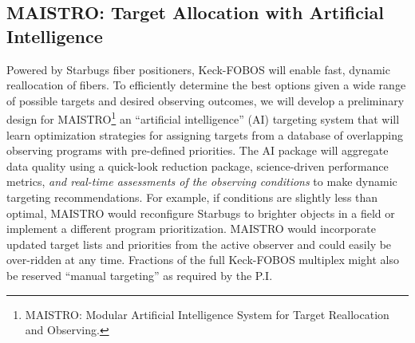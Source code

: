 \documentclass[oneside,11pt]{amsart}
\newcommand{\comment}[2][todo]{{\color{#1}[[{\bf #2}]]}}
\begin{document}






\subsection{MAISTRO: Target Allocation with Artificial Intelligence}
\label{sec:targeting}

Powered by Starbugs fiber positioners, Keck-FOBOS will enable fast, dynamic reallocation of fibers.  To efficiently
determine the best options given a wide range of possible targets and desired observing outcomes, we will develop a
preliminary design for MAISTRO\footnote{MAISTRO: Modular Artificial Intelligence System for Target Reallocation and
Observing.} an ``artificial intelligence'' (AI) targeting system that will learn optimization strategies for assigning
targets from a database of overlapping observing programs with pre-defined priorities.  The AI package will aggregate
data quality using a quick-look reduction package, science-driven performance metrics, {\it and real-time assessments
of the observing conditions} to make dynamic targeting recommendations.  For example, if conditions are
slightly less than optimal, MAISTRO would reconfigure Starbugs to brighter objects in a field or implement a different program prioritization.  MAISTRO would incorporate updated target lists and priorities from the active observer and could easily be over-ridden at any time.   Fractions of the full Keck-FOBOS multiplex might also be reserved ``manual targeting'' as required by the P.I.  
\end{document}
